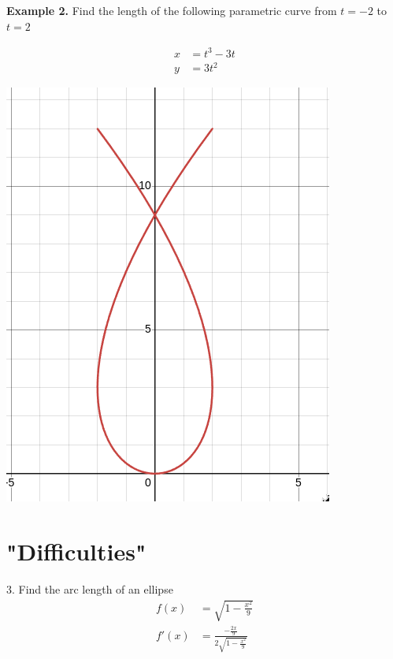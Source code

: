 \documentclass[12pt]{extarticle}
\begin{document}
\vspace{8cm}

\textbf{Example 2.} Find the length of the following parametric curve from $t = -2$ to $t = 2$

\begin{align} 
    x &= t^3 - 3t \\ 
    y &= 3t^2  
\end{align}

\begin{center}
    \includegraphics[height = 0.3\textheight]{Graph.png}
\end{center}



\vspace{15cm}

\section{"Difficulties"}
3. Find the arc length of an ellipse
\begin{align}
    f(x) &= \sqrt{1-\frac{x^2}{9}} \\
    f'(x) &= \frac{-\frac{2x}{9}}{2\sqrt{1-\frac{x^2}{9}}}
\end{align}

\begin{center}
    \end{center}
\end{document}
